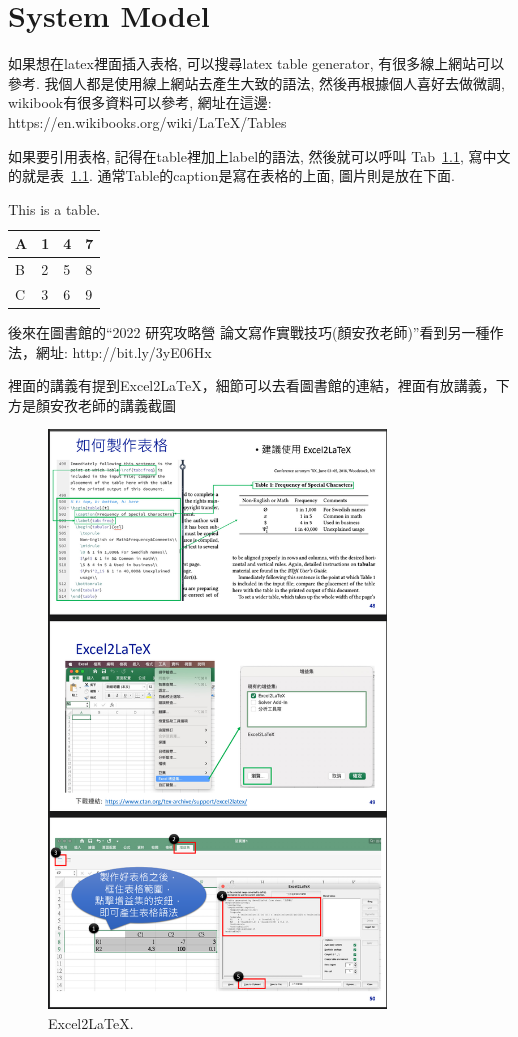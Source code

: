\chapter{System Model}
\label{ch:architecture}

如果想在latex裡面插入表格, 可以搜尋latex table generator, 有很多線上網站可以參考. 我個人都是使用線上網站去產生大致的語法, 然後再根據個人喜好去做微調, wikibook有很多資料可以參考, 網址在這邊: https://en.wikibooks.org/wiki/LaTeX/Tables

如果要引用表格, 記得在table裡加上label的語法, 然後就可以呼叫 Tab~\ref{tab1}, 寫中文的就是表~\ref{tab1}. 通常Table的caption是寫在表格的上面, 圖片則是放在下面.

\begin{table}[!ht]
    \centering
    \caption{This is a table.}
    \label{tab1}
    \begin{tabular}{|l|l|l|l|}
    \hline
        A & 1 & 4 & 7 \\ \hline
        B & 2 & 5 & 8 \\ \hline
        C & 3 & 6 & 9 \\ \hline
    \end{tabular}
\end{table}

後來在圖書館的``2022 研究攻略營 論文寫作實戰技巧(顏安孜老師)''看到另一種作法，網址: http://bit.ly/3yE06Hx

裡面的講義有提到Excel2LaTeX，細節可以去看圖書館的連結，裡面有放講義，下方是顏安孜老師的講義截圖

\begin{figure}[htb]
	\centering
	\includegraphics[width=0.8\textwidth]{img/excel2latex.png}
	\caption{Excel2LaTeX.}
	\label{fig:model}
\end{figure}

